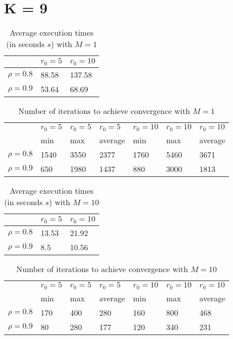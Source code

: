 \documentclass[a4paper,11pt,openright]{report}
\begin{document}
\section*{K = 9}
\begin{table}[H]
\centering
\addtolength{\leftskip}{-1.5cm}
\addtolength{\rightskip}{-1.5cm}
\begin{tabular}{|c|ll|}
\hline
$ $ & $r_0 = 5$ & $r_0 = 10$ \\
\hline
$\rho = 0.8$ & 88.58 & 137.58 \\
$\rho = 0.9$ & 53.64 & 68.69 \\
\hline
\end{tabular}
\caption{Average execution times (in seconds $s$) with $M = 1$}
\end{table}
\begin{table}[H]
\centering
\addtolength{\leftskip}{-1.5cm}
\addtolength{\rightskip}{-1.5cm}
\begin{tabular}{|c|llllll|}
\hline
$ $ & $r_0 = 5$ & $r_0 = 5$ & $r_0 = 5$ & $r_0 = 10$ & $r_0 = 10$ & $r_0 = 10$ \\
$ $ & min & max & average & min & max & average \\
\hline
$\rho = 0.8$ & 1540 & 3550 & 2377 & 1760 & 5460 & 3671 \\
$\rho = 0.9$ & 650 & 1980 & 1437 & 880 & 3000 & 1813 \\
\hline
\end{tabular}
\caption{Number of iterations to achieve convergence with $M = 1$}
\end{table}
\begin{table}[H]
\centering
\addtolength{\leftskip}{-1.5cm}
\addtolength{\rightskip}{-1.5cm}
\begin{tabular}{|c|ll|}
\hline
$ $ & $r_0 = 5$ & $r_0 = 10$ \\
\hline
$\rho = 0.8$ & 13.53 & 21.92 \\
$\rho = 0.9$ & 8.5 & 10.56\\
\hline
\end{tabular}
\caption{Average execution times (in seconds $s$) with $M = 10$}
\end{table}
\begin{table}[H]
\centering
\addtolength{\leftskip}{-1.5cm}
\addtolength{\rightskip}{-1.5cm}
\begin{tabular}{|c|llllll|}
\hline
$ $ & $r_0 = 5$ & $r_0 = 5$ & $r_0 = 5$ & $r_0 = 10$ & $r_0 = 10$ & $r_0 = 10$ \\
$ $ & min & max & average & min & max & average \\
\hline
$\rho = 0.8$ & 170 & 400 & 280 & 160 & 800 & 468 \\
$\rho = 0.9$ & 80 & 280 & 177 & 120 & 340 & 231 \\
\hline
\end{tabular}
\caption{Number of iterations to achieve convergence with $M = 10$}
\end{table}
\end{document}
